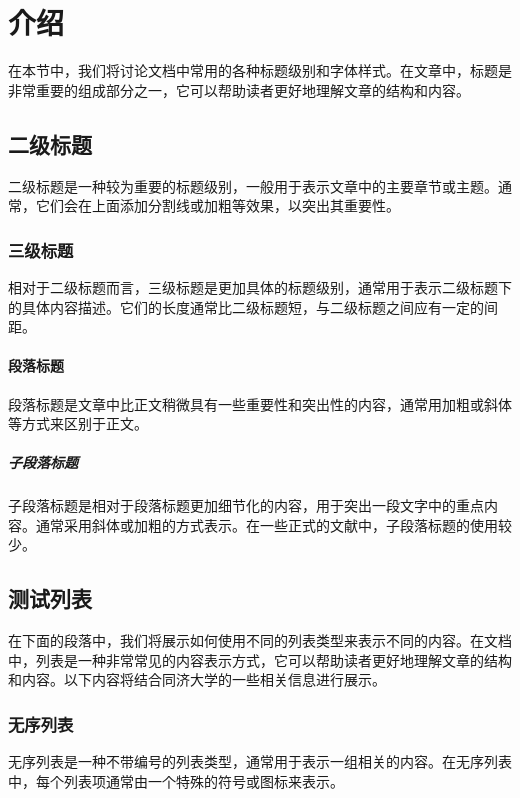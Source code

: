 \section{介绍}\label{sec:introduction}

在本节中，我们将讨论文档中常用的各种标题级别和字体样式。在文章中，标题是非常重要的组成部分之一，它可以帮助读者更好地理解文章的结构和内容。

\subsection{二级标题}

二级标题是一种较为重要的标题级别，一般用于表示文章中的主要章节或主题。通常，它们会在上面添加分割线或加粗等效果，以突出其重要性。

\subsubsection{三级标题}

相对于二级标题而言，三级标题是更加具体的标题级别，通常用于表示二级标题下的具体内容描述。它们的长度通常比二级标题短，与二级标题之间应有一定的间距。

\paragraph{段落标题}

段落标题是文章中比正文稍微具有一些重要性和突出性的内容，通常用加粗或斜体等方式来区别于正文。

\subparagraph{子段落标题}

子段落标题是相对于段落标题更加细节化的内容，用于突出一段文字中的重点内容。通常采用斜体或加粗的方式表示。在一些正式的文献中，子段落标题的使用较少。

\subsection{测试列表}

在下面的段落中，我们将展示如何使用不同的列表类型来表示不同的内容。在文档中，列表是一种非常常见的内容表示方式，它可以帮助读者更好地理解文章的结构和内容。以下内容将结合同济大学的一些相关信息进行展示。

\subsubsection{无序列表}

无序列表是一种不带编号的列表类型，通常用于表示一组相关的内容。在无序列表中，每个列表项通常由一个特殊的符号或图标来表示。

